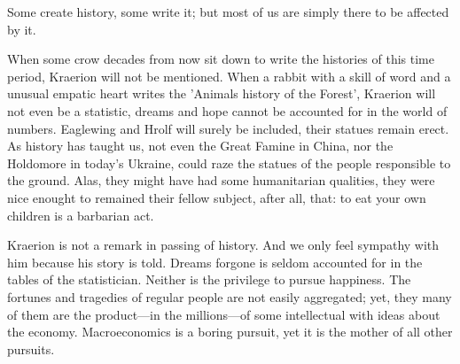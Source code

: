 Some create history, some write it; but most of us are simply there to be affected by it.

When some crow decades from now sit down to write the histories of this time period, Kraerion will not be mentioned. When a rabbit with a skill of word and a unusual empatic heart writes the 'Animals history of the Forest', Kraerion will not even be a statistic, dreams and hope cannot be accounted for in the world of numbers. Eaglewing and Hrolf will surely be included, their statues remain erect. As history has taught us, not even the Great Famine in China, nor the Holdomore in today's Ukraine, could raze the statues of the people responsible to the ground. Alas, they might have had some humanitarian qualities, they were nice enought to remained their fellow subject, after all, that: to eat your own children is a barbarian act.

Kraerion is not a remark in passing of history. And we only feel sympathy with him because his story is told. Dreams forgone is seldom accounted for in the tables of the statistician. Neither is the privilege to pursue happiness. The fortunes and tragedies of regular people are not easily aggregated;  yet, they many of them are the product---in the millions---of some intellectual with ideas about the economy. Macroeconomics is a boring pursuit, yet it is the mother of all other pursuits.




